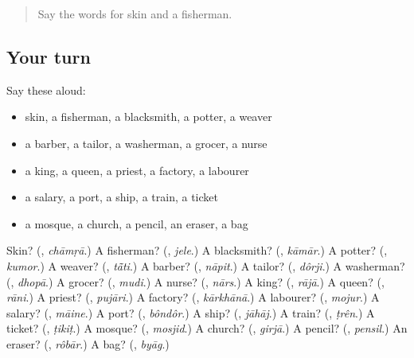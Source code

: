 \label{lesson:BN-R129-second-pass-clothes-and-animals}



\begin{quote}
Say the words for skin and a fisherman.
\end{quote}

\subsection*{Your turn}
Say these aloud:

\begin{itemize}
\raggedright
  \item skin, a fisherman, a blacksmith, a potter, a weaver
  \item a barber, a tailor, a washerman, a grocer, a nurse
  \item a king, a queen, a priest, a factory, a labourer
  \item a salary, a port, a ship, a train, a ticket
  \item a mosque, a church, a pencil, an eraser, a bag
\end{itemize}

\begin{tcolorbox}[breakable,colback=teal!4,colframe=teal!35!black,title={Before you move on}]
Skin? (\textbf{}, \emph{chāmṛā}.) A fisherman? (\textbf{}, \emph{jele}.) A blacksmith? (\textbf{}, \emph{kāmār}.) A potter? (\textbf{}, \emph{kumor}.) A weaver? (\textbf{}, \emph{tā̃ti}.) A barber? (\textbf{}, \emph{nāpit}.) A tailor? (\textbf{}, \emph{dôrji}.) A washerman? (\textbf{}, \emph{dhopā}.) A grocer? (\textbf{}, \emph{mudi}.) A nurse? (\textbf{}, \emph{nārs}.) A king? (\textbf{}, \emph{rājā}.) A queen? (\textbf{}, \emph{rāni}.) A priest? (\textbf{}, \emph{pujāri}.) A factory? (\textbf{}, \emph{kārkhānā}.) A labourer? (\textbf{}, \emph{mojur}.) A salary? (\textbf{}, \emph{māine}.) A port? (\textbf{}, \emph{bôndôr}.) A ship? (\textbf{}, \emph{jāhāj}.) A train? (\textbf{}, \emph{ṭrên}.) A ticket? (\textbf{}, \emph{ṭikiṭ}.) A mosque? (\textbf{}, \emph{mosjid}.) A church? (\textbf{}, \emph{girjā}.) A pencil? (\textbf{}, \emph{pensil}.) An eraser? (\textbf{}, \emph{rôbār}.) A bag? (\textbf{}, \emph{byāg}.)
\end{tcolorbox}
